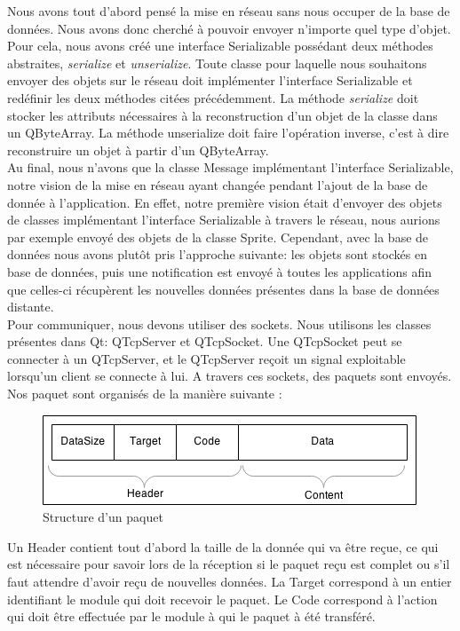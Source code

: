 Nous avons tout d'abord pensé la mise en réseau sans nous occuper de la base de données. Nous avons donc cherché à pouvoir envoyer n'importe quel type d'objet. Pour cela, nous avons créé une interface Serializable possédant deux méthodes abstraites, \emph{serialize} et \emph{unserialize}. Toute classe pour laquelle nous souhaitons envoyer des objets sur le réseau doit implémenter l'interface Serializable et redéfinir les deux méthodes citées précédemment. La méthode \emph{serialize} doit stocker les attributs nécessaires à la reconstruction d'un objet de la classe dans un QByteArray. La méthode unserialize doit faire l'opération inverse, c'est à dire reconstruire un objet à partir d'un QByteArray.\\
Au final, nous n'avons que la classe Message implémentant l'interface Serializable, notre vision de la mise en réseau ayant changée pendant l'ajout de la base de donnée à l'application. En effet, notre première vision était d'envoyer des objets de classes implémentant l'interface Serializable à travers le réseau, nous aurions par exemple envoyé des objets de la classe Sprite. Cependant, avec la base de données nous avons plutôt pris l'approche suivante: les objets sont stockés en base de données, puis une notification est envoyé à toutes les applications afin que celles-ci récupèrent les nouvelles données présentes dans la base de données distante.\\

Pour communiquer, nous devons utiliser des sockets. Nous utilisons les classes présentes dans Qt: QTcpServer et QTcpSocket. Une QTcpSocket peut se connecter à un QTcpServer, et le QTcpServer reçoit un signal exploitable lorsqu'un client se connecte à lui. A travers ces sockets, des paquets sont envoyés. Nos paquet sont organisés de la manière suivante :\\

\begin{figure}[h!]
	\centering
	\includegraphics[scale=0.6]{img/network_packet.png}
	\caption{Structure d'un paquet}
\end{figure}

Un Header contient tout d'abord la taille de la donnée qui va être reçue, ce qui est nécessaire pour savoir lors de la réception si le paquet reçu est complet ou s'il faut attendre d'avoir reçu de nouvelles données. La Target correspond à un entier identifiant le module qui doit recevoir le paquet. Le Code correspond à l'action qui doit être effectuée par le module à qui le paquet à été transféré.\\

